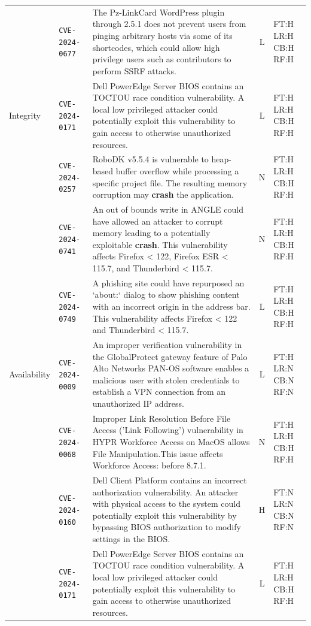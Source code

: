 \begin{table}[p]
\begin{tabular}{@{}llp{6.2cm}cl@{}}
 & \texttt{CVE-2024-0677} & The Pz-LinkCard WordPress plugin through 2.5.1 does not prevent users from pinging arbitrary hosts via some of its shortcodes, which could allow high privilege users such as contributors to perform SSRF attacks. & L & FT:H LR:H CB:H RF:H \\
\addlinespace[3pt]
Integrity & \texttt{CVE-2024-0171} & Dell PowerEdge Server BIOS contains an TOCTOU race condition vulnerability. A local low privileged attacker could potentially exploit this vulnerability to gain access to otherwise unauthorized resources. & L & FT:H LR:H CB:H RF:H \\
 & \texttt{CVE-2024-0257} & RoboDK v5.5.4 is vulnerable to heap-based buffer overflow while processing a specific project file. The resulting memory corruption may \textbf{crash} the application. & N & FT:H LR:H CB:H RF:H \\
 & \texttt{CVE-2024-0741} & An out of bounds write in ANGLE could have allowed an attacker to corrupt memory leading to a potentially exploitable \textbf{crash}. This vulnerability affects Firefox \textless{} 122, Firefox ESR \textless{} 115.7, and Thunderbird \textless{} 115.7. & N & FT:H LR:H CB:H RF:H \\
 & \texttt{CVE-2024-0749} & A phishing site could have repurposed an `about:` dialog to show phishing content with an incorrect origin in the address bar. This vulnerability affects Firefox \textless{} 122 and Thunderbird \textless{} 115.7. & L & FT:H LR:H CB:H RF:H \\
\addlinespace[3pt]
Availability & \texttt{CVE-2024-0009} & An improper verification vulnerability in the GlobalProtect gateway feature of Palo Alto Networks PAN-OS software enables a malicious user with stolen credentials to establish a VPN connection from an unauthorized IP address. & L & FT:H LR:N CB:N RF:N \\
 & \texttt{CVE-2024-0068} & Improper Link Resolution Before File Access ('Link Following') vulnerability in HYPR Workforce Access on MacOS allows File Manipulation.This issue affects Workforce Access: before 8.7.1. & N & FT:H LR:H CB:H RF:H \\
 & \texttt{CVE-2024-0160} & Dell Client Platform contains an incorrect authorization vulnerability. An attacker with physical access to the system could potentially exploit this vulnerability by bypassing BIOS authorization to modify settings in the BIOS. & H & FT:N LR:N CB:N RF:N \\
 & \texttt{CVE-2024-0171} & Dell PowerEdge Server BIOS contains an TOCTOU race condition vulnerability. A local low privileged attacker could potentially exploit this vulnerability to gain access to otherwise unauthorized resources. & L & FT:H LR:H CB:H RF:H \\
\bottomrule
\end{tabular}
\end{table}
